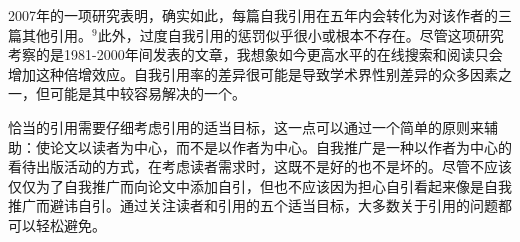 2007年的一项研究表明，确实如此，每篇自我引用在五年内会转化为对该作者的三篇其他引用。${ }^{9}$此外，过度自我引用的惩罚似乎很小或根本不存在。尽管这项研究考察的是1981-2000年间发表的文章，我想象如今更高水平的在线搜索和阅读只会增加这种倍增效应。自我引用率的差异很可能是导致学术界性别差异的众多因素之一，但可能是其中较容易解决的一个。

恰当的引用需要仔细考虑引用的适当目标，这一点可以通过一个简单的原则来辅助：使论文以读者为中心，而不是以作者为中心。自我推广是一种以作者为中心的看待出版活动的方式，在考虑读者需求时，这既不是好的也不是坏的。尽管不应该仅仅为了自我推广而向论文中添加自引，但也不应该因为担心自引看起来像是自我推广而避讳自引。通过关注读者和引用的五个适当目标，大多数关于引用的问题都可以轻松避免。

